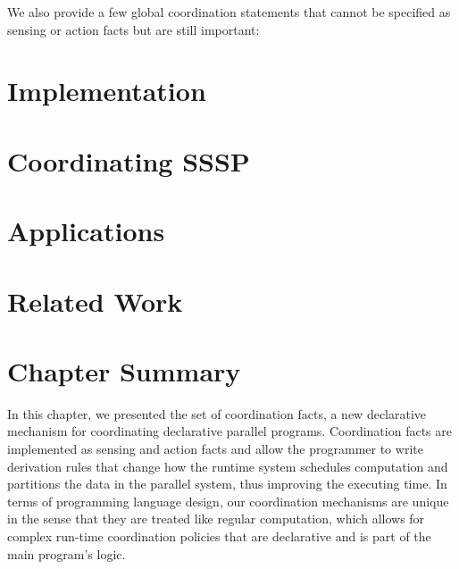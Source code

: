 We also provide a few global coordination statements that cannot be specified
as sensing or action facts but are still important:


\section{Implementation}


\section{Coordinating SSSP}


\section{Applications}



\section{Related Work}\label{sec:coordination:related}

\section{Chapter Summary}

In this chapter, we presented the set of coordination facts, a new declarative
mechanism for coordinating declarative parallel programs. Coordination facts are
implemented as sensing and action facts and allow the programmer to write
derivation rules that change how the runtime system schedules computation and
partitions the data in the parallel system, thus improving the executing time.
In terms of programming language design, our coordination mechanisms are unique
in the sense that they are treated like regular computation, which allows for
complex run-time coordination policies that are declarative and is part of the
main program's logic.
